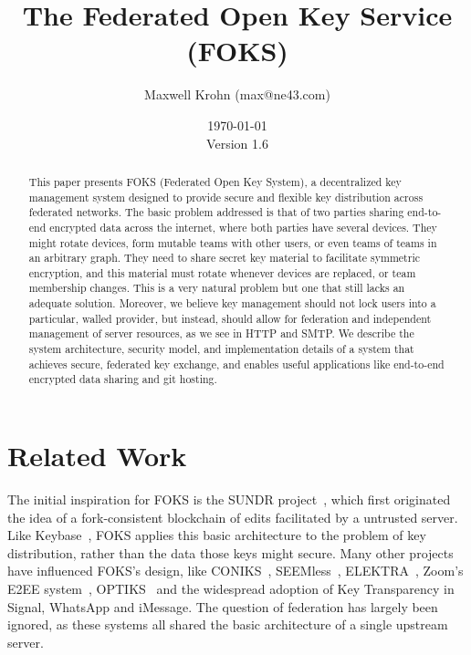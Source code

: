 \documentclass[11pt]{article}
\title{The Federated Open Key Service (FOKS)}
\author{Maxwell Krohn (max@ne43.com)}
\date{\today\\Version 1.6}
\begin{document}
\newcommand{\yubi}{Yubikey}
\newcommand{\Yubi}{Yubikey}
\newcommand{\yubis}{Yubikeys}
\newcommand{\Yubis}{Yubikeys}

\maketitle

\begin{abstract}

This paper presents FOKS (Federated Open Key System), a
decentralized key management system designed to provide secure and flexible key
distribution across federated networks. The basic problem addressed is that 
of two parties sharing end-to-end encrypted data across the internet, where both
parties have several devices. They might rotate devices, form mutable teams with
other users, or even teams of teams in an arbitrary graph. They need to share
secret key material to facilitate symmetric encryption, and this material must
rotate whenever devices are replaced, or team membership changes.  This is a
very natural problem but one that still lacks an adequate solution.  Moreover, we
believe key management should not lock users into a particular, walled provider,
but instead, should allow for federation and independent management of server
resources, as we see in HTTP and SMTP.  We describe the system architecture,
security model, and implementation details of a system that achieves secure,
federated key exchange, and enables useful applications like end-to-end
encrypted data sharing and git hosting.

\end{abstract}











\section{Related Work}

The initial inspiration for FOKS is the SUNDR project~\cite{sundr}, which first
originated the idea of a fork-consistent blockchain of edits facilitated by a
untrusted server.  Like Keybase~\cite{keybase}, FOKS applies this basic
architecture to the problem of key distribution, rather than the data those keys
might secure. Many other projects have influenced FOKS's design, like
CONIKS~\cite{melara2015coniks}, SEEMless~\cite{chase2019seemless}, 
ELEKTRA~\cite{cryptoeprint:2024/107}, Zoom's E2EE system~\cite{zoom_e2e_v4}, 
OPTIKS~\cite{cryptoeprint:2023/1515} and the widespread adoption of Key
Transparency in Signal, WhatsApp and iMessage. The question of federation has
largely been ignored, as these systems all shared the basic architecture of a
single upstream server. 
\end{document}
